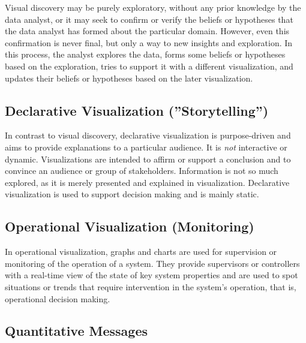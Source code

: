 Visual discovery may be purely exploratory, without any prior knowledge by the data analyst, or it may seek to confirm or verify the beliefs or hypotheses that the data analyst has formed about the particular domain. However, even this confirmation is never final, but only a way to new insights and exploration. In this process, the analyst explores the data, forms some beliefs or hypotheses based on the exploration, tries to support it with a different visualization, and updates their beliefs or hypotheses based on the later visualization.

\subsection*{Declarative Visualization (''Storytelling'')}

In contrast to visual discovery, declarative visualization is purpose-driven and aims to provide explanations to a particular audience. It is \emph{not} interactive or dynamic. Visualizations are intended to affirm or support a conclusion and to convince an audience or group of stakeholders. Information is not so much explored, as it is merely presented and explained in visualization. Declarative visualization is used to support decision making and is mainly static. 

\subsection*{Operational Visualization (Monitoring)}

In operational visualization, graphs and charts are used for supervision or monitoring of the operation of a system. They provide supervisors or controllers with a real-time view of the state of key system properties and are used to spot situations or trends that require intervention in the system's operation, that is, operational decision making. 

\subsection*{Quantitative Messages} 

